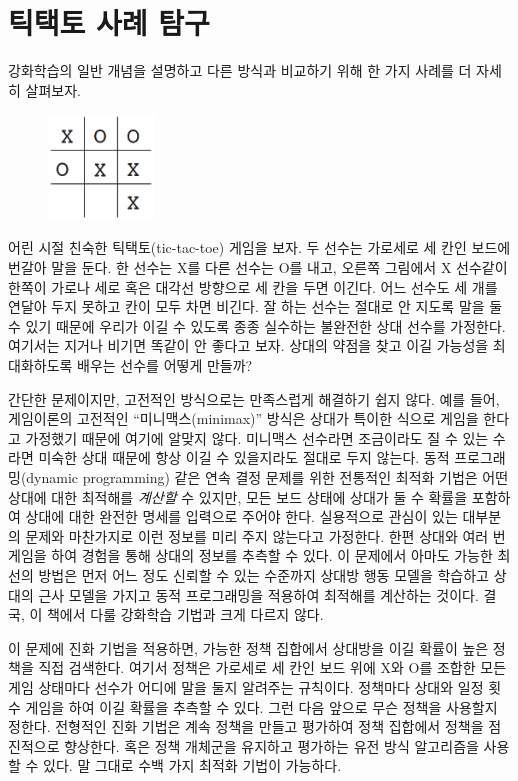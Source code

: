 
\section{틱택토 사례 탐구}

강화학습의 일반 개념을 설명하고 다른 방식과 비교하기 위해 한 가지 사례를 더
자세히 살펴보자.

\begin{figure}
\raggedleft
\includegraphics[width=0.25\textwidth]{img/figure_1_tic_tac_toe_board.png}
\end{figure}
어린 시절 친숙한 틱택토(tic-tac-toe) 게임을 보자. 두 선수는 가로세로 세 칸인
보드에 번갈아 말을 둔다. 한 선수는 X를 다른 선수는 O를 내고, 오른쪽 그림에서
X 선수같이 한쪽이 가로나 세로 혹은 대각선 방향으로 세 칸을 두면 이긴다. 어느
선수도 세 개를 연달아 두지 못하고 칸이 모두 차면 비긴다. 잘 하는 선수는 절대로
안 지도록 말을 둘 수 있기 때문에 우리가 이길 수 있도록 종종 실수하는 불완전한
상대 선수를 가정한다. 여기서는 지거나 비기면 똑같이 안 좋다고 보자. 상대의
약점을 찾고 이길 가능성을 최대화하도록 배우는 선수를 어떻게 만들까?

간단한 문제이지만, 고전적인 방식으로는 만족스럽게 해결하기 쉽지 않다. 예를 들어,
게임이론의 고전적인 ``미니맥스(minimax)'' 방식은 상대가 특이한 식으로 게임을
한다고 가정했기 때문에 여기에 알맞지 않다. 미니맥스 선수라면 조금이라도 질 수
있는 수라면 미숙한 상대 때문에 항상 이길 수 있을지라도 절대로 두지 않는다. 동적
프로그래밍(dynamic programming) 같은 연속 결정 문제를 위한 전통적인 최적화
기법은 어떤 상대에 대한 최적해를 \emph{계산할} 수 있지만, 모든 보드 상태에
상대가 둘 수 확률을 포함하여 상대에 대한 완전한 명세를 입력으로 주어야 한다.
실용적으로 관심이 있는 대부분의 문제와 마찬가지로 이런 정보를 미리 주지 않는다고
가정한다. 한편 상대와 여러 번 게임을 하여 경험을 통해 상대의 정보를 추측할 수
있다. 이 문제에서 아마도 가능한 최선의 방법은 먼저 어느 정도 신뢰할 수 있는
수준까지 상대방 행동 모델을 학습하고 상대의 근사 모델을 가지고 동적 프로그래밍을
적용하여 최적해를 계산하는 것이다. 결국, 이 책에서 다룰 강화학습 기법과 크게
다르지 않다.

이 문제에 진화 기법을 적용하면, 가능한 정책 집합에서 상대방을 이길 확률이 높은
정책을 직접 검색한다. 여기서 정책은 가로세로 세 칸인 보드 위에 X와 O를 조합한
모든 게임 상태마다 선수가 어디에 말을 둘지 알려주는 규칙이다. 정책마다 상대와
일정 횟수 게임을 하여 이길 확률을 추측할 수 있다. 그런 다음 앞으로 무슨 정책을
사용할지 정한다. 전형적인 진화 기법은 계속 정책을 만들고 평가하여 정책 집합에서
정책을 점진적으로 향상한다. 혹은 정책 개체군을 유지하고 평가하는 유전 방식
알고리즘을 사용할 수 있다. 말 그대로 수백 가지 최적화 기법이 가능하다.

